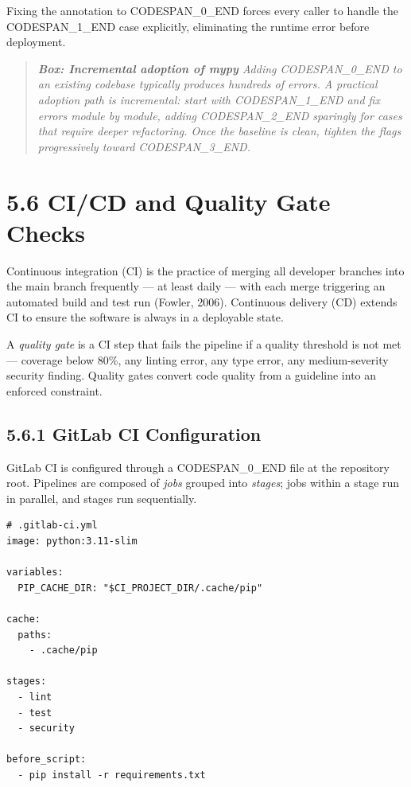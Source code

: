 \documentclass[11pt,a4paper]{book}
\begin{document}
Fixing the annotation to CODESPAN\_0\_END forces every caller to handle the CODESPAN\_1\_END case explicitly, eliminating the runtime error before deployment.

\begin{quote}
\textit{\textbf{Box: Incremental adoption of mypy}  Adding CODESPAN\_0\_END to an existing codebase typically produces hundreds of errors. A practical adoption path is incremental: start with CODESPAN\_1\_END and fix errors module by module, adding CODESPAN\_2\_END sparingly for cases that require deeper refactoring. Once the baseline is clean, tighten the flags progressively toward CODESPAN\_3\_END.}
\end{quote}

\medskip

\section{5.6 CI/CD and Quality Gate Checks}

Continuous integration (CI) is the practice of merging all developer branches into the main branch frequently --- at least daily --- with each merge triggering an automated build and test run (Fowler, 2006). Continuous delivery (CD) extends CI to ensure the software is always in a deployable state.

A \textit{quality gate} is a CI step that fails the pipeline if a quality threshold is not met --- coverage below 80\%, any linting error, any type error, any medium-severity security finding. Quality gates convert code quality from a guideline into an enforced constraint.

\subsection{5.6.1 GitLab CI Configuration}

GitLab CI is configured through a CODESPAN\_0\_END file at the repository root. Pipelines are composed of \textit{jobs} grouped into \textit{stages}; jobs within a stage run in parallel, and stages run sequentially.

\begin{lstlisting}
# .gitlab-ci.yml
image: python:3.11-slim

variables:
  PIP_CACHE_DIR: "$CI_PROJECT_DIR/.cache/pip"

cache:
  paths:
    - .cache/pip

stages:
  - lint
  - test
  - security

before_script:
  - pip install -r requirements.txt
\end{lstlisting}
\end{document}
